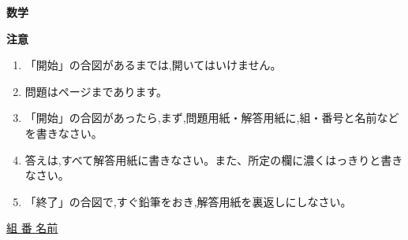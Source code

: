 \documentclass[
  12pt,a4paper,lualatex,ja=standard]{bxjsarticle}
\begin{document}
\makeatletter
\newenvironment{figurehere}{\def\@captype{figure}}{}
\makeatother

\newcommand{\haiten}[1]{%
\begin{flushright}%
\footnotesize{＜#1＞}%
\end{flushright}%
}


\thispagestyle{empty}
\begin{center}
\phantom{empty}

\vspace{60truemm}

\hspace{4em} {\HUGE\gtfamily\bfseries 数\hspace{2em}学}\\
\vspace{84truemm}

{\large\gtfamily\bfseries 注\hspace{5em}意}

\end{center}

\centering
\begin{framed}
\begin{flushleft}
\begin{enumerate}
  \item {\large 「開始」の合図があるまでは,開いてはいけません。}

  \item {\large 問題は\pageref{LastPage}ページまであります。}

  \item {\large 「開始」の合図があったら,まず,問題用紙・解答用紙に,組・番号と名前などを書きなさい。}

  \item {\large 答えは,すべて解答用紙に書きなさい。また、所定の欄に濃くはっきりと書きなさい。}

  \item {\large 「終了」の合図で,すぐ鉛筆をおき,解答用紙を裏返しにしなさい。}
\end{enumerate}
\end{flushleft}
\end{framed}

\vspace{14mm}

\begin{center}
{\large \underline{\hspace{30mm}組 \hspace{30mm}番 \hspace{15mm} 名前 \hspace{60mm}}}
\end{center}
\newpage
\end{document}
